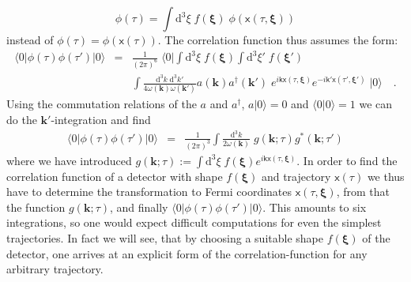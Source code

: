 \documentclass[a4paper,12pt]{article}
\newcommand{\bra}[1]{\langle #1|}
\newcommand{\ket}[1]{|#1\rangle }
\newcommand{\braket}[2]{\langle #1|#2\rangle}
\newcommand{\vk}{\mathbf{k}}
\newcommand{\vxi}{\boldsymbol{\xi}}
\newcommand{\vvx}{\mathsf x}
\newcommand{\vvk}{\mathsf k}
\newcommand{\vac}{\ket{0}}
\newcommand{\cav}{\bra{0}}
\renewcommand{\d}{\mathrm{d}}
\begin{document}
\begin{equation}
\phi(\tau)=\int\d^3\xi\;f(\vxi)\;\phi(\vvx(\tau,\vxi))
\end{equation}
instead of $\phi(\tau)=\phi(\vvx(\tau))$. The correlation function thus assumes
the form:
\begin{eqnarray*}
\cav\phi(\tau)\phi(\tau')\vac&=&\frac{1}{(2\pi)^6}\;\cav\int\d^3\xi\;f(\vxi)
\int\d^3\xi'\;f(\vxi')\\
&&\int\frac{\d^3k\;\d^3k'}{4\omega(\vk)\omega(\vk')}a(\vk)a^\dag(\vk')\;
e^{i\vvk\vvx(\tau,\vxi)}e^{-i\vvk'\vvx(\tau',\vxi')}\;\vac\quad.
\end{eqnarray*}
Using the commutation relations of the
$a$ and $a^\dag$, $a\vac=0$ and $\braket{0}{0}=1$ we can do the
$\vk'$-integration and find \begin{eqnarray*}
\cav\phi(\tau)\phi(\tau')\vac&=&\frac{1}{(2\pi)^3}\int\frac{\d^3k}
{2\omega(\vk)}\;g(\vk;\tau)g^*(\vk;\tau') \end{eqnarray*} where we have introduced
$g(\vk;\tau):=\int\d^3\xi\;f(\vxi)e^{i\vvk\vvx(\tau,\vxi)}$.
In order to find the correlation function of a detector with shape $f(\vxi)$
and trajectory $\vvx(\tau)$ we thus have to determine the transformation to 
Fermi coordinates $\vvx(\tau,\vxi)$, from that the function $g(\vk;\tau)$, and
finally $\cav\phi(\tau)\phi(\tau')\vac$. This amounts to six integrations, so one
would expect difficult computations for even the simplest trajectories. In fact we will
see, that by choosing a suitable shape $f(\vxi)$ of the detector, one arrives at an 
explicit form of the correlation-function for any arbitrary trajectory.
\end{document}
